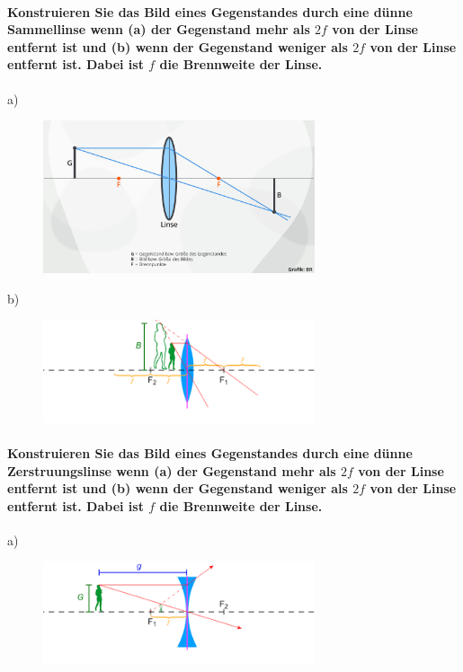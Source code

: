 \documentclass[a4paper, 11pt, ngerman, parskip=half-]{scrartcl}
\begin{document}
\paragraph{Konstruieren Sie das Bild eines Gegenstandes durch eine dünne Sammellinse wenn (a) der
Gegenstand mehr als $2f$ von der Linse entfernt ist und (b) wenn der Gegenstand weniger als $2f$ von
der Linse entfernt ist. Dabei ist $f$ die Brennweite der Linse.}

a)
\begin{figure}[H]
    \centering
    \includegraphics[width=8cm]{image/17/geo15a}
\end{figure}



b)
\begin{figure}[H]
    \centering
    \includegraphics[width=8cm]{image/17/geo15b}
\end{figure}







\paragraph{Konstruieren Sie das Bild eines Gegenstandes durch eine dünne Zerstruungslinse wenn (a)
der Gegenstand mehr als $2f$ von der Linse entfernt ist und (b) wenn der Gegenstand weniger
als $2f$ von der Linse entfernt ist. Dabei ist $f$ die Brennweite der Linse.}


a)
\begin{figure}[H]
    \centering
    \includegraphics[width=8cm]{image/17/geo16a}
\end{figure}
\end{document}
